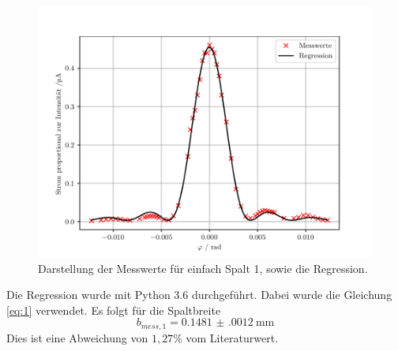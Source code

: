 \begin{figure}[H]
  \centering
  \includegraphics{plot1.pdf}
  \caption{Darstellung der Messwerte für einfach Spalt 1, sowie die Regression.}
  \label{abb:4}
\end{figure}

Die Regression wurde mit Python 3.6 durchgeführt.
Dabei wurde die Gleichung  \ref{eq:1} verwendet.
Es folgt für die Spaltbreite
\begin{equation*}
  b_{mess,1} = \SI{0.1481(0012)}{\milli\meter}
\end{equation*}
Dies ist eine Abweichung von $1,27 \%$ vom Literaturwert.

